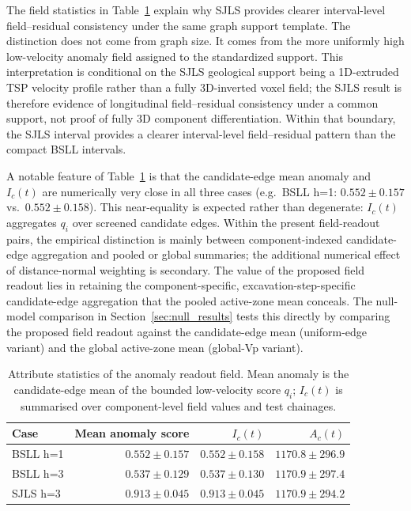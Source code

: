The field statistics in Table~\ref{tab:descriptor_attribute_stats}
explain why SJLS provides clearer interval-level field--residual consistency under the same
graph support template. The distinction does not come from graph size. It comes
from the more uniformly high low-velocity anomaly field assigned to the
standardized support. This interpretation is conditional on the SJLS
geological support being a 1D-extruded TSP velocity profile rather than a fully
3D-inverted voxel field; the SJLS result is therefore evidence of longitudinal
field--residual consistency under a common support, not proof of fully 3D
component differentiation. Within that boundary, the SJLS interval provides a
clearer interval-level field--residual pattern than the compact BSLL intervals.

A notable feature of Table~\ref{tab:descriptor_attribute_stats} is that the
candidate-edge mean anomaly and $I_c(t)$ are numerically very close in all
three cases (e.g.\ BSLL h=1: $0.552 \pm 0.157$ vs.\ $0.552 \pm 0.158$). This
near-equality is expected rather than degenerate: $I_c(t)$ aggregates $q_i$
over screened candidate edges. Within the present field-readout pairs, the
empirical distinction is mainly between component-indexed candidate-edge
aggregation and pooled or global summaries; the additional numerical effect of
distance-normal weighting is secondary. The value of the proposed field readout lies
in retaining the component-specific, excavation-step-specific candidate-edge
aggregation that the pooled active-zone mean conceals. The null-model
comparison in Section~\ref{sec:null_results} tests this directly by comparing
the proposed field readout against the candidate-edge mean (uniform-edge
variant) and the global active-zone mean (global-Vp variant).

\begin{table}[htbp]
\centering
\caption{Attribute statistics of the anomaly readout field. Mean anomaly is the
candidate-edge mean of the bounded low-velocity score $q_i$; $I_c(t)$ is
summarised over component-level field values and test chainages.}
\label{tab:descriptor_attribute_stats}
\scriptsize
\setlength{\tabcolsep}{4pt}
\begin{tabular}{lrrr}
\toprule
Case & Mean anomaly score & $I_c(t)$ & $A_c(t)$ \\
\midrule
BSLL h=1 & $0.552 \pm 0.157$ & $0.552 \pm 0.158$ & $1170.8 \pm 296.9$ \\
BSLL h=3 & $0.537 \pm 0.129$ & $0.537 \pm 0.130$ & $1170.9 \pm 297.4$ \\
SJLS h=3 & $0.913 \pm 0.045$ & $0.913 \pm 0.045$ & $1170.9 \pm 294.2$ \\
\bottomrule
\end{tabular}
\end{table}

